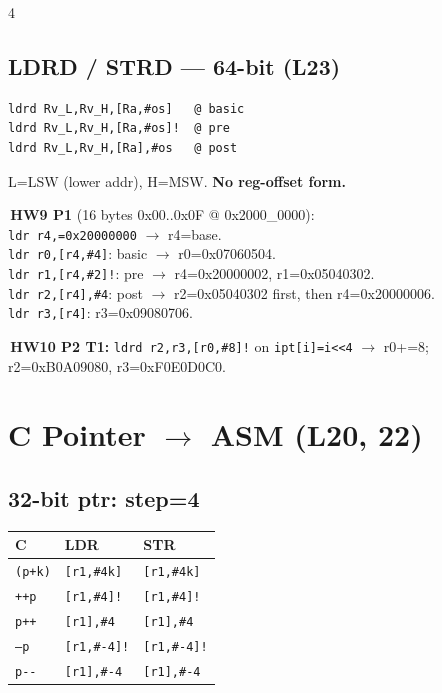 \documentclass[8pt,landscape]{extarticle}
\newcommand{\asm}[1]{\texttt{\scriptsize #1}}
\newcommand{\cee}[1]{\texttt{\scriptsize #1}}
\newenvironment{ex}
  {\par\smallskip\noindent{\scriptsize\color{red!55!black}\textbf{Ex.}}\,\scriptsize\ignorespaces}
  {\par}
\begin{document}
\begin{multicols*}{4}
\subsection{LDRD / STRD --- 64-bit (L23)}
\begin{lstlisting}
ldrd Rv_L,Rv_H,[Ra,#os]   @ basic
ldrd Rv_L,Rv_H,[Ra,#os]!  @ pre
ldrd Rv_L,Rv_H,[Ra],#os   @ post
\end{lstlisting}
L=LSW (lower addr), H=MSW. \textbf{No reg-offset form.}

\begin{ex}\textbf{HW9 P1} (16 bytes 0x00..0x0F @ 0x2000\_0000):\\
\asm{ldr r4,=0x20000000} $\to$ r4=base.\\
\asm{ldr r0,[r4,\#4]}: basic $\to$ r0=0x07060504.\\
\asm{ldr r1,[r4,\#2]!}: pre $\to$ r4=0x20000002, r1=0x05040302.\\
\asm{ldr r2,[r4],\#4}: post $\to$ r2=0x05040302 first, then r4=0x20000006.\\
\asm{ldr r3,[r4]}: r3=0x09080706.\end{ex}

\begin{ex}\textbf{HW10 P2 T1:} \asm{ldrd r2,r3,[r0,\#8]!} on \texttt{ipt[i]=i<<4} $\to$ r0+=8; r2=0xB0A09080, r3=0xF0E0D0C0.\end{ex}

\section{C Pointer $\to$ ASM (L20, 22)}

\subsection{32-bit ptr: step=4}
\begin{tabular}{@{}lll@{}}
\toprule
C & LDR & STR \\
\midrule
\cee{*(p+k)} & \asm{[r1,\#4k]}  & \asm{[r1,\#4k]} \\
\cee{*++p}   & \asm{[r1,\#4]!}  & \asm{[r1,\#4]!} \\
\cee{*p++}   & \asm{[r1],\#4}   & \asm{[r1],\#4}  \\
\cee{*--p}   & \asm{[r1,\#-4]!} & \asm{[r1,\#-4]!}\\
\cee{*p-{}-} & \asm{[r1],\#-4}  & \asm{[r1],\#-4} \\
\bottomrule
\end{tabular}


\end{multicols*}
\end{document}
